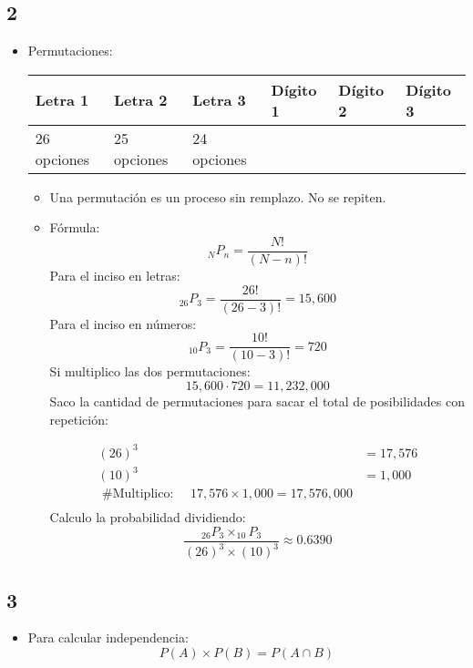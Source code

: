 \subsection{2}
\begin{itemize}
    \item Permutaciones: 
        \begin{center}
           \begin{tabular}{ | p{5cm} | p{5cm} | p{5cm} |  p{5cm} |  p{5cm} | p{5cm} |}
               \hline
                    Letra 1 & Letra 2 & Letra 3             & Dígito 1 &  Dígito 2 & Dígito 3 \\
               \hline
                    26 opciones & 25 opciones & 24 opciones &  \\ 
               \hline
           \end{tabular}
           \begin{itemize}[label=\#]
               \item Una permutación es un proceso sin remplazo. No se repiten.
               \item Fórmula:
                    \[
                      _NP_n = \frac{N!}{(N-n)!} 
                    \]
                    Para el inciso en letras:
                    \[
                        _{26}P_3 = \frac{26!}{(26-3)!} = 15,600
                    \]
                    Para el inciso en números:
                    \[
                      _{10}P_3= \frac{10!}{(10-3)!} = 720 
                    \]
                    Si multiplico las dos permutaciones:
                    \[
                      15,600\cdot720 = 11,232,000 
                    \]
                    Saco la cantidad de permutaciones para sacar el total de posibilidades con repetición: 
                    \begin{center}
                       \begin{align*}
                           (26)^3 &= 17,576 \\ 
                           (10)^3 &= 1,000 \\ 
                           \text{  \# Multiplico:  } \quad 17,576 \times 1,000 = 17,576,000 \\ 
                       \end{align*}
                    Calculo la probabilidad dividiendo:
                    \[
                      \frac{_{26}P_3 \times _{10}P_3}{(26)^3\times(10)^3} \approx 0.6390
                    \]
                    \end{center}
           \end{itemize}
        \end{center}
\end{itemize}



\subsection{3}
\begin{itemize}
    \item Para calcular independencia:
        \[
          P(A) \times P(B) = P(A\cap B)
        \]
\end{itemize}
